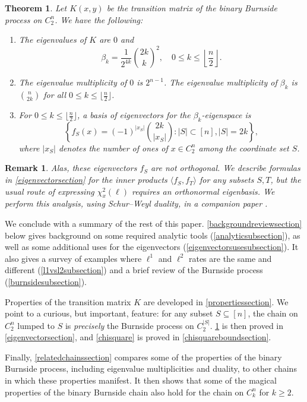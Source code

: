 \documentclass[11pt]{article}
\newcounter{r}
\newcounter{s}
\numberwithin{equation}{section}
\newtheorem{theorem}{Theorem}[section]
\newtheorem*{remark}{Remark}
\begin{document}
\begin{theorem}\label{eigenvectors}
Let $K(x, y)$ be the transition matrix of the binary Burnside process on $C_2^n$. We have the following:
\begin{enumerate}
    \item The eigenvalues of $K$ are $0$ and
    \[
        \beta_k = \frac{1}{2^{4k}} \binom{2k}{k}^2, \quad 0 \le k \le \left\lfloor \frac{n}{2} \right\rfloor.
    \]
    \item The eigenvalue multiplicity of $0$ is $2^{n-1}$. The eigenvalue multiplicity of $\beta_k$ is $\binom{n}{2k}$ for all $0 \le k \le \lfloor \frac{n}{2} \rfloor$.
    \item For $0 \le k \le \lfloor\frac{n}{2}\rfloor$, a basis of eigenvectors for the $\beta_k$-eigenspace is 
    \[
        \left\{f_S(x) = (-1)^{|x_S|} \binom{2k}{|x_S|}: |S| \subset [n], |S| = 2k\right\},
    \]
    where $|x_S|$ denotes the number of ones of $x \in C_2^n$ among the coordinate set $S$.
\end{enumerate}
\end{theorem}

\begin{remark}
Alas, these eigenvectors $f_S$ are not orthogonal. We describe formulas in \cref{eigenvectorsection} for the inner products $\langle f_S, f_T \rangle$ for any subsets $S, T$, but the usual route of expressing $\chi_x^2(\ell)$ requires an orthonormal eigenbasis. We perform this analysis, using Schur--Weyl duality, in a companion paper \cite{diaconislinram2}.
\end{remark}

We conclude with a summary of the rest of this paper. \cref{backgroundreviewsection} below gives background on some required analytic tools (\cref{analyticsubsection}), as well as some additional uses for the eigenvectors (\cref{eigenvectorsusesubsection}). It also gives a survey of examples where $\ell^1$ and $\ell^2$ rates are the same and different (\cref{l1vsl2subsection}) and a brief review of the Burnside process (\cref{burnsidesubsection}).

Properties of the transition matrix $K$ are developed in \cref{propertiessection}. We point to a curious, but important, feature: for any subset $S \subseteq [n]$, the chain on $C_2^n$ lumped to $S$ is \textit{precisely} the Burnside process on $C_2^{|S|}$. \cref{eigenvectors} is then proved in \cref{eigenvectorsection}, and \cref{chisquare} is proved in \cref{chisquareboundsection}.

Finally, \cref{relatedchainssection} compares some of the properties of the binary Burnside process, including eigenvalue multiplicities and duality, to other chains in which these properties manifest. It then shows that some of the magical properties of the binary Burnside chain also hold for the chain on $C_k^n$ for $k \ge 2$. 
\end{document}
